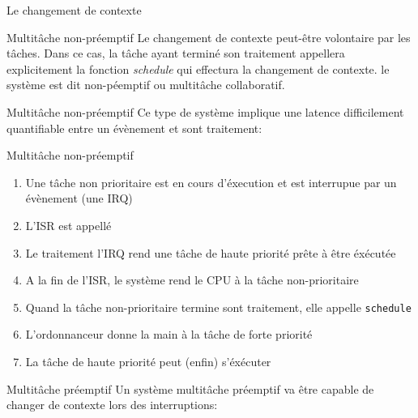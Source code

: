 \begin{frame}{Le changement de contexte}
  \begin{center}
  \end{center}
\end{frame}

\begin{frame}{Multitâche non-préemptif}
  Le changement de contexte  peut-être volontaire par les tâches. Dans
  ce   cas,  la   tâche   ayant  terminé   son  traitement   appellera
  explicitement   la  fonction   \emph{schedule}   qui  effectura   la
  changement  de   contexte.  le  système  est   dit  non-péemptif  ou
  multitâche collaboratif.
\end{frame}

\begin{frame}{Multitâche non-préemptif}
  Ce type  de système implique une  latence difficilement quantifiable
  entre un évènement et sont traitement:
  \begin{center}
  \end{center}
\end{frame}

\begin{frame}{Multitâche non-préemptif}
  \begin{enumerate}
  \item  Une tâche  non prioritaire  est en  cours d'éxecution  et est
    interrupue par un évènement (une IRQ)
  \item L'ISR est appellé
  \item Le traitement  l'IRQ rend une tâche de  haute priorité prête à
    être éxécutée
  \item  A  la fin  de  l'ISR,  le système  rend  le  CPU  à la  tâche
    non-prioritaire
  \item Quand  la tâche non-prioritaire termine  sont traitement, elle
    appelle \texttt{schedule}
  \item L'ordonnanceur donne la main à la tâche de forte priorité
  \item La tâche de haute priorité peut (enfin) s'éxécuter
  \end{enumerate}
\end{frame}

\begin{frame}{Multitâche préemptif}
  Un  système  multitâche préemptif  va  être  capable  de changer  de
  contexte lors des interruptions:
  \begin{center}
  \end{center}
\end{frame}

